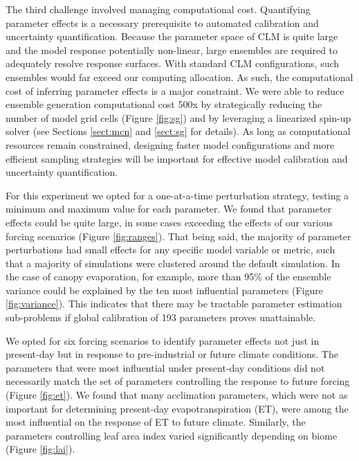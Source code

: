 \documentclass[draft]{agujournal2019}
\begin{document}
The third challenge involved managing computational cost.  Quantifying parameter effects is a necessary prerequisite to automated calibration and uncertainty quantification. Because the parameter space of CLM is quite large and the model response potentially non-linear, large ensembles are required to adequately resolve response surfaces. With standard CLM configurations, such ensembles would far exceed our computing allocation. As such, the computational cost of inferring parameter effects is a major constraint. We were able to reduce ensemble generation computational cost 500x by strategically reducing the number of model grid cells (Figure \ref{fig:sg}) and by leveraging a linearized spin-up solver (see Sections \ref{sect:mcn} and \ref{sect:sg} for details). As long as computational resources remain constrained, designing faster model configurations and more efficient sampling strategies will be important for effective model calibration and uncertainty quantification. 

For this experiment we opted for a one-at-a-time perturbation strategy, testing a minimum and maximum value for each parameter. We found that parameter effects could be quite large, in some cases exceeding the effects of our various forcing scenarios (Figure \ref{fig:ranges}). That being said, the majority of parameter perturbations had small effects for any specific model variable or metric, such that a majority of simulations were clustered around the default simulation. In the case of canopy evaporation, for example, more than 95\% of the ensemble variance could be explained by the ten most influential parameters (Figure \ref{fig:variance}). This indicates that there may be tractable parameter estimation sub-problems if global calibration of 193 parameters proves unattainable. 

We opted for six forcing scenarios to identify parameter effects not just in present-day but in response to pre-industrial or future climate conditions. The parameters that were most influential under present-day conditions did not necessarily match the set of parameters controlling the response to future forcing (Figure \ref{fig:et}). We found that many acclimation parameters, which were not as important for determining present-day evapotranspiration (ET), were among the most influential on the response of ET to future climate. Similarly, the parameters controlling leaf area index varied significantly depending on biome (Figure \ref{fig:lai}).
\end{document}

